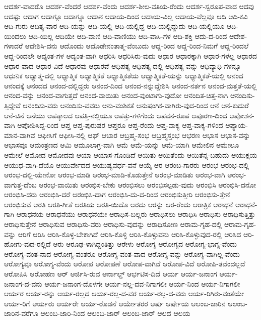 {ಆದರ್ಶ-ವಾದರೊ
ಆದರ್ಶ-ವೆಂದರೆ
ಆದರ್ಶ-ವೆಂದು
ಆದರ್ಶ-ಶೀಲ-ವತಿಯ-ರೆಂದು
ಆದರ್ಶ-ಸ್ವರೂಪ-ವಾದ
ಆದವು
ಆದಷ್ಟು
ಆದಾಗ
ಆದಾಗ್ಗೂ
ಆದಾಗ್ಯೂ
ಆದಾನ
ಆದಾಯ-ದಿಂದ
ಆದಾಯ-ವಿಲ್ಲ
ಆದಾಯ-ವೆಲ್ಲವೂ
ಆದಿ
ಆದಿ-ಕವಿ
ಆದಿ-ಗುರು
ಆದಿತ್ಯ-ವಾರ
ಆದಿ-ಯನ್ನು
ಆದಿ-ಯಲ್ಲಿ
ಆದಿ-ಯಲ್ಲಿದ್ದ
ಆದಿ-ಯಲ್ಲಿದ್ದುದು
ಆದಿ-ಯಲ್ಲಿಯೂ
ಆದಿ-ಯಿಂದಲು
ಆದಿ-ಯಿಲ್ಲ
ಆದಿಯೇ
ಆದಿ-ವಾಣಿ
ಆದಿ-ವಾಣಿಯು
ಆದಿ-ವಾಸಿ-ಗಳ
ಆದಿ-ಶಕ್ತಿ
ಆದು-ದ-ರಿಂದ
ಆದೇಶ-ಗಳಾದರೆ
ಆದೇಶಿಸಿ-ದನು
ಆದೊಂದು
ಆದೊಡೇನಂತಾತ್ಮ-ವೆಂಬುದು
ಆದ್ದ-ರಿಂದ
ಆದ್ದ-ರಿಂದ-ನಿಮಗೆ
ಆದ್ದ-ರಿಂದಲೆ
ಆದ್ದ-ರಿಂದಲೇ
ಆದ್ಯಂತ-ಗಳ
ಆದ್ಯಂತ-ವಾಗಿ
ಆಧರಿಸಿ
ಆಧರಿಸಿರು-ವುದು
ಆಧಾರ
ಆಧಾರಕ್ಕಾಗಿ
ಆಧಾರ-ಗಳೆಲ್ಲ
ಆಧಾರದ
ಆಧಾರ-ವಾದ
ಆಧಾರ-ವಿದೆ
ಆಧಾರವು
ಆಧಾರವೆ
ಆಧಿಪತ್ಯ
ಆಧಿಪತ್ಯ-ದಲ್ಲಿ
ಆಧಿಪತ್ಯ-ವನ್ನು
ಆಧಿವ್ಯಾಧಿ-ಗಳನ್ನೂ
ಆಧುನಿಕ
ಆಧ್ಯಾತ್ಮ-ದಲ್ಲಿ
ಆಧ್ಯಾತ್ಮಿಕ
ಆಧ್ಯಾತ್ಮಿಕತೆ
ಆಧ್ಯಾತ್ಮಿಕತೆಯ
ಆಧ್ಯಾತ್ಮಿಕತೆ-ಯನ್ನು
ಆಧ್ಯಾತ್ಮಿಕತೆ-ಯಲ್ಲಿ
ಆನಂದ
ಆನಂದಕ್ಕೆ
ಆನಂದದ
ಆನಂದ-ದಲ್ಲಿದ್ದರು
ಆನಂದ-ದಿಂದ
ಆನಂದ-ನನ್ನುದ್ದೇಶಿಸಿ
ಆನಂದ-ನರ್ತನ
ಆನಂದ-ಮತ್ತತೆ-ಯಲ್ಲಿ
ಆನಂದ-ವನ್ನು
ಆನಂದ-ವಾಗುತ್ತದೆ
ಆನಂದ-ವಾಯಿತು
ಆನಂದ-ವುಂಟಾಗು-ವುದೋ
ಆನಂದಿತ-ಚಿತ್ತ-ನಾಗಿ
ಆನಂದಿಸು-ತ್ತಿದ್ದೇವೆ
ಆನಂದಿಸು-ವರು
ಆನಂದಿಸು-ವವರು
ಆನು-ವಂಶಿಕತೆ
ಆನುಷಂಗಿಕ-ವಾಗಿರು-ವುದ-ರಿಂದ
ಆನೆ
ಆನೆ-ಕುದುರೆ
ಆನೆ-ಚಿನೆ
ಆನೆಯು
ಆಪತ್ಕಾಲದ
ಆಪತ್ತಿ-ನಲ್ಲಿಯೂ
ಆಪತ್ತು-ಗಳಿಗೆಂದು
ಆಪವನ-ರೂಪ
ಆಪೂರಣ-ದಿಂದ
ಆಪೋಶನ-ವಾಗಿ
ಆಪೋಶಿಸಿದ್ದ-ರಿಂದ
ಆಪ್ತ
ಆಪ್ತ-ಪುರುಷರ
ಆಪ್ತರೂ
ಆಪ್ತ-ರೆಂದು
ಆಪ್ತ-ವಾಕ್ಯ
ಆಪ್ತ-ವಾಕ್ಯ-ಗಳಿಂದ
ಆಪ್ಯಾಯ-ಮಾನ-ವಾಗಿವೆ
ಆಫೀಸಿಗೆ
ಆಫೀಸಿ-ನಲ್ಲಿ
ಆಫ್
ಆಬಾರ
ಆಬ್ರಹ್ಮ-ಸಂಭ
ಆಬ್ರಹ್ಮಸ್ತಂಭ
ಆಭರಣ
ಆಭಾಸ
ಆಭಾಸ-ವನ್ನು
ಆಭಾಸವೂ
ಆಮಂತ್ರಣದ
ಆಮಿ
ಆಮೂಲಾಗ್ರ-ವಾಗಿ
ಆಮೆ
ಆಮೆ-ಯನ್ನು
ಆಮೆ-ಯಾಗಿ
ಆಮೇಲಿನ
ಆಮೇಲೂ
ಆಮೇಲೆ
ಆಮೋದ
ಆಮೋದವು
ಆಯಾ
ಆಯಾಸ-ಗೊಂಡಿದೆ
ಆಯಿತು
ಆಯಿತೆಂದು
ಆಯಿತೆನ್ನ-ಬಹುದು
ಆಯುಕ್ಷಯ
ಆಯುಧ-ವಾಗಿ-ದೆಯೊ
ಆಯುರ್ವೇದದ
ಆಯುಷ್ಯವರ್ಧ-ವನೆ
ಆಯ್ಕೆ
ಆರ
ಆರಂಬ-ಗಾರರು
ಆರಂಭ
ಆರಂಭ-ದಲ್ಲಿ
ಆರಂಭ-ದಲ್ಲಿ-ಯೇನೋ
ಆರಂಭ-ಮಾಡಿ
ಆರಂಭ-ಮಾಡಿ-ಕೊಡುತ್ತೇನೆ
ಆರಂಭ-ಮಾಡಿತು
ಆರಂಭ-ವಾಗಿ
ಆರಂಭ-ವಾಗುತ್ತ-ದೆಂಬ
ಆರಂಭ-ವಾಯಿತು
ಆರಂಭಿಸ-ಬೇಕು
ಆರಂಭಿಸಲು
ಆರಂಭಿಸಲ್ಪಡು-ವುದು
ಆರಂಭಿಸಿ
ಆರಂಭಿಸಿ-ದನೋ
ಆರಂಭಿಸಿ-ದರು
ಆರಂಭಿಸಿ-ದರೆ
ಆರಂಭಿಸಿ-ದಾಗ
ಆರಂಭಿಸಿ-ದು-ದ-ರಿಂದ
ಆರಂಭಿಸುತ್ತೀರಿ
ಆರಂಭಿಸು-ತ್ತೇನೆ
ಆರಂಭಿಸುವೆ
ಆರತಿ
ಆರತಿ-ಗೀತೆ
ಆರತಿಯ
ಆರತಿ-ಯಿದೊ
ಆರದು
ಆರನ್ನು
ಆರ-ರೆಂದು
ಆರಾತ್ರಿಕ
ಆರಾಧನೆ
ಆರಾಧನೆ-ಗಾಗಿ
ಆರಾಧನೆಯ
ಆರಾಧನೆಯು
ಆರಾಧನೆಯೇ
ಆರಾಧಿಸ-ಬಲ್ಲರು
ಆರಾಧಿಸಲು
ಆರಾಧಿಸಿ
ಆರಾಧಿಸು
ಆರಾಧಿಸುತ್ತಿತ್ತು
ಆರಾಧಿಸುತ್ತೇನೆ
ಆರಾಧಿಸುವ
ಆರಾಧಿಸು-ವರು
ಆರಾಧಿಸು-ವುದನ್ನು
ಆರಾಧಿಸೋಣ
ಆರಾಮ-ಗೃಹ-ದಲ್ಲಿ
ಆರಾಮ-ಗೃಹ-ವನ್ನು
ಆರಿಗೆ
ಆರಿಸಿ
ಆರಿಸಿ-ಕೊಳ್ಳ-ಬೇಕಾಗಿದೆ
ಆರಿಸಿ-ಕೊಳ್ಳಿ
ಆರಿಸಿ-ಕೊಳ್ಳುವನು
ಆರಿಸಿ-ಕೊಳ್ಳುವುದ-ರಲ್ಲಿ
ಆರಿಸಿದ
ಆರಿ-ಹೋಗು-ವುದ-ರಲ್ಲಿದೆ
ಆರು
ಆರೂಢ-ಳಾಗಿದ್ದಂತಿತ್ತು
ಆರೇಳು
ಆರೋಗ್ಯ
ಆರೋಗ್ಯದ
ಆರೋಗ್ಯ-ಭಾಗ್ಯ-ವೆಂದು
ಆರೋಗ್ಯ-ವಂತ-ನಾದ
ಆರೋಗ್ಯ-ವಂತರೂ
ಆರೋಗ್ಯ-ವಂತ-ವಾದ
ಆರೋಗ್ಯ-ವನ್ನು
ಆರೋಗ್ಯ-ವಾಗಿಲ್ಲ-ವೆಂದು
ಆರೋಗ್ಯವೂ
ಆರೋಗ್ಯ-ವೆಂದು
ಆರೋಪ
ಆರೋಪಣೆ
ಆರೋಪ-ವಾಗಿವೆ
ಆರೋಪ-ವಿದೆ
ಆರೋಪಿ-ತವೆಂದಲ್ಲದೆ
ಆರೋಪಿಸಿ
ಆರೋಹಣ
ಆರ್
ಆರ್ಜಿಸಿ-ರುವ
ಆರ್ನಾಲ್ಡ್
ಆರ್ಭಟಿಸ-ದಿದೆ
ಆರ್ಯ
ಆರ್ಯ-ಜನಾಂಗ
ಆರ್ಯ-ಜನಾಂಗ-ದ-ವನು
ಆರ್ಯ-ಜನಾಂಗ-ದೊಳಗೇ
ಆರ್ಯ-ನಲ್ಲ-ದವ-ನಿಗಾಗಲೀ
ಆರ್ಯ-ನಿಂದ
ಆರ್ಯ-ನಿಗಾಗಲೀ
ಆರ್ಯರ
ಆರ್ಯ-ರನ್ನು
ಆರ್ಯ-ರಲ್ಲದ
ಆರ್ಯ-ರಲ್ಲ-ದ-ವರ
ಆರ್ಯ-ರಲ್ಲ-ದ-ವರು
ಆರ್ಯ-ರಿಗಿರು-ವಂತೆಯೇ
ಆರ್ಯ-ರಿಗೆ
ಆರ್ಯರು
ಆರ್ಯರೇ
ಆರ್ಯ-ರೊಡನೆ
ಆರ್ಯೇತರರ
ಆರ್ಷ
ಆರ್ಷೇಯ
ಆಲಂಬ-ಜಾರಿನ
ಆಲಂಬ-ಜಾರಿನ-ವರೆಗೂ
ಆಲಂಬ-ಜಾರಿ-ನಿಂದ
ಆಲಂಬ-ಜಾರ್
ಆಲಂಬ-ಜಾರ್
ಆಲದ
ಆಲಯ
}
